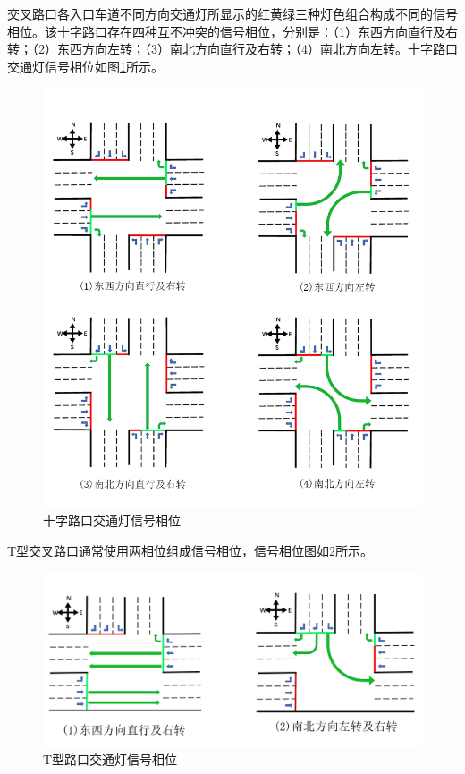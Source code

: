 交叉路口各入口车道不同方向交通灯所显示的红黄绿三种灯色组合构成不同的信号相位。该十字路口存在四种互不冲突的信号相位，分别是：（1）东西方向直行及右转；（2）东西方向左转；（3）南北方向直行及右转；（4）南北方向左转。十字路口交通灯信号相位如图\ref{fig:intersection_phase}所示。
\begin{figure}[H]
	\centering
	\includegraphics[width=\textwidth]{figures/intersection_phase.png}
	\caption{十字路口交通灯信号相位}
	\label{fig:intersection_phase}
\end{figure}


T型交叉路口通常使用两相位组成信号相位，信号相位图如\ref{fig:T_intersection_phase}所示。


\begin{figure}[H]
	\centering
	\includegraphics[width=\textwidth]{figures/T_intersection_phase.png}
	\caption{T型路口交通灯信号相位}
	\label{fig:T_intersection_phase}
\end{figure}

